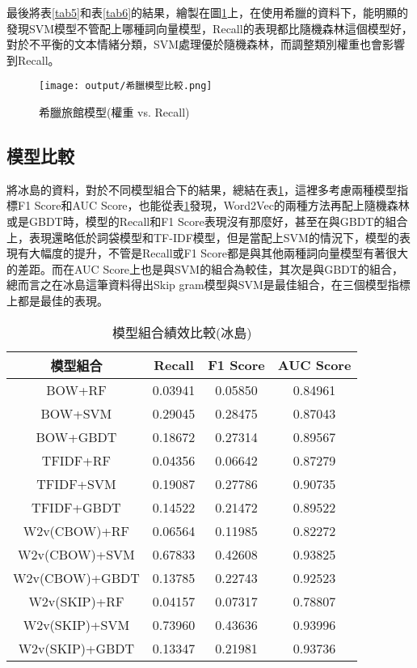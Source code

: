 最後將表\ref{tab5}和表\ref{tab6}的結果，繪製在圖\ref{Fig5}上，在使用希臘的資料下，能明顯的發現SVM模型不管配上哪種詞向量模型，Recall的表現都比隨機森林這個模型好，對於不平衡的文本情緒分類，SVM處理優於隨機森林，而調整類別權重也會影響到Recall。\\
	
	\begin{figure}[H]
	\centering
	\texttt{[image: output/希臘模型比較.png]}
	\caption{希臘旅館模型(權重 vs. Recall)}
	\label{Fig5}
	\end{figure}
	
\newpage

\subsection{模型比較}

	將冰島的資料，對於不同模型組合下的結果，總結在表\ref{tab7}，這裡多考慮兩種模型指標F1 Score和AUC Score，也能從表\ref{tab7}發現，Word2Vec的兩種方法再配上隨機森林或是GBDT時，模型的Recall和F1 Score表現沒有那麼好，甚至在與GBDT的組合上，表現還略低於詞袋模型和TF-IDF模型，但是當配上SVM的情況下，模型的表現有大幅度的提升，不管是Recall或F1 Score都是與其他兩種詞向量模型有著很大的差距。而在AUC Score上也是與SVM的組合為較佳，其次是與GBDT的組合，總而言之在冰島這筆資料得出Skip gram模型與SVM是最佳組合，在三個模型指標上都是最佳的表現。
	
	\begin{table}[H]
	\centering
	\caption{模型組合績效比較(冰島)}
	\begin{tabular}{|c|ccc|}
	\toprule
	模型組合 & Recall & F1 Score & AUC Score \\
	\midrule
	BOW+RF & 0.03941 & 0.05850 & 0.84961 \\
	\midrule
	BOW+SVM & 0.29045 & 0.28475 & 0.87043  \\
	\midrule
	BOW+GBDT & 0.18672 & 0.27314 & 0.89567  \\
	\midrule
	TFIDF+RF & 0.04356 & 0.06642 & 0.87279 \\
	\midrule
	TFIDF+SVM & 0.19087 & 0.27786 & 0.90735  \\
	\midrule
	TFIDF+GBDT & 0.14522 & 0.21472 & 0.89522  \\
	\midrule
	W2v(CBOW)+RF & 0.06564 & 0.11985 & 0.82272 \\
	\midrule
	W2v(CBOW)+SVM & 0.67833 & 0.42608 & 0.93825 \\
	\midrule
	W2v(CBOW)+GBDT & 0.13785 & 0.22743 & 0.92523  \\
	\midrule
	W2v(SKIP)+RF & 0.04157 & 0.07317 & 0.78807 \\
	\midrule
	W2v(SKIP)+SVM & 0.73960 & 0.43636 & 0.93996 \\
	\midrule
	W2v(SKIP)+GBDT & 0.13347 & 0.21981 & 0.93736  \\
	\bottomrule
	\end{tabular}
	\label{tab7}
	\end{table}
	
